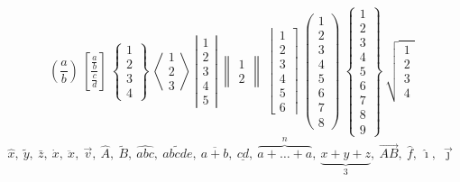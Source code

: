 \documentclass[11pt]{article}
\begin{document}
\[ \left(\frac{a}{b}\right)\ \left[\frac{\frac ab}{\frac cd}\right]\ \left\{\begin{matrix}1\\2\\3\\4\end{matrix}\right\}\
   \left\langle\begin{matrix}1\\2\\3\end{matrix}\right\rangle\ \left|\begin{matrix}1\\2\\3\\4\\5\end{matrix}\right|\
   \left\|\begin{matrix}1\\2\end{matrix}\right\|\ \left\lfloor\begin{matrix}1\\2\\3\\4\\5\\6\end{matrix}\right\rceil\
   \left(\begin{matrix}1\\2\\3\\4\\5\\6\\7\\8\end{matrix}\right)\ \left\{\begin{matrix}1\\2\\3\\4\\5\\6\\7\\8\\9\end{matrix}\right\}
   \ \sqrt{\begin{matrix}1\\2\\3\\4\end{matrix}} \]
\[ \hat{x},\ \tilde{y},\ \bar{z},\ \dot{x},\ \ddot{x},\ \vec{v},\ \hat{A},\ \tilde{B},\ \widehat{abc},\ \widetilde{abcde},\
   \overline{a+b},\ \underline{cd},\ \overbrace{a+\dots+a}^{n},\ \underbrace{x+y+z}_{3},\ \overrightarrow{AB},\ \hat{f},\ \hat{\imath},\ \vec{\jmath} \]
\end{document}

